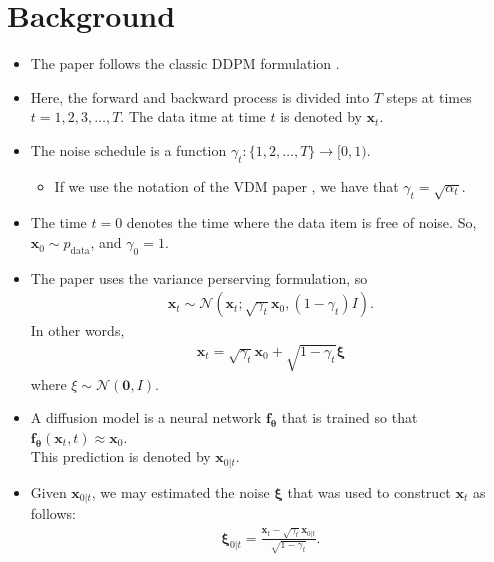 \documentclass[10pt]{article}
\newcommand{\ve}[1]{\mathbf{#1}}
\newcommand{\ves}[1]{\boldsymbol{#1}}
\newcommand{\mcal}[1]{\mathcal{#1}}
\newcommand{\data}{\mathrm{data}}
\begin{document}
\section{Background}

\begin{itemize}
  \item The paper follows the classic DDPM formulation \cite{Ho:2020}.
  
  \item Here, the forward and backward process is divided into $T$ steps at times $t = 1,2,3,\dotsc,T$. The data itme at time $t$ is denoted by $\ve{x}_t$.
  
  \item The noise schedule is a function $\gamma_t: \{1, 2, \dotsc, T \} \rightarrow [0,1)$.
  \begin{itemize}
    \item If we use the notation of the VDM paper \cite{Kingma:2021}, we have that $\gamma_t = \sqrt{\alpha_t}$.
  \end{itemize}
  
  \item The time $t=0$ denotes the time where the data item is free of noise. So, $\ve{x}_0 \sim p_{\data}$, and $\gamma_0 = 1$.
  
  \item The paper uses the variance perserving formulation, so \begin{align*}
    \ve{x}_t \sim \mcal{N}(\ve{x}_t; \sqrt{\gamma_t} \ve{x}_0, (1 - \gamma_t) I ).
  \end{align*}
  In other words,
  \begin{align*}
    \ve{x}_t = \sqrt{\gamma_t} \ve{x}_0 + \sqrt{1 - \gamma_t} \ves{\xi}
  \end{align*}
  where $\xi \sim \mcal{N}(\ve{0},I)$.

  \item A diffusion model is a neural network $\ve{f}_{\ves{\theta}}$ that is trained so that $\ve{f}_{\ves{\theta}}(\ve{x}_t, t) \approx \ve{x}_0$.\\ This prediction is denoted by $\ve{x}_{0|t}$. 
  
  \item Given $\ve{x}_{0|t}$, we may estimated the noise $\ves{\xi}$ that was used to construct $\ve{x}_t$ as follows:
  \begin{align*}
    \ves{\xi}_{0|t} = \frac{\ve{x}_t - \sqrt{\gamma_t} \ve{x}_{0|t}}{\sqrt{1 - \gamma_t}}.
  \end{align*}


\end{itemize}
\end{document}
